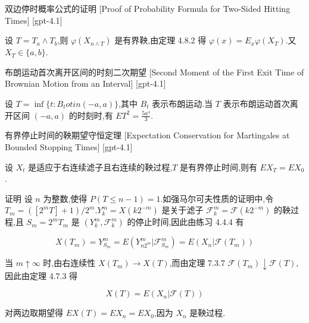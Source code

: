 \documentclass[UTF8]{ctexart}
\begin{document}
    
    
    \begin{prf}
        {双边停时概率公式的证明}
        [Proof of Probability Formula for Two-Sided Hitting Times]
        [gpt-4.1]
        
设 $T = T_a \land T_b$,则 $\varphi(X_{n \wedge T})$ 是有界鞅,由定理 4.8.2 得 $\varphi(x) = E_x \varphi(X_T)$.又 $X_T \in \{a, b\}$.

    \end{prf}
    
    
    
    \begin{thm}
        {布朗运动首次离开区间的时刻二次期望}
        [Second Moment of the First Exit Time of Brownian Motion from an Interval]
        [gpt-4.1]
        
设 $T = \operatorname*{inf} \{ t : B_{t} 
otin (-a, a) \}$,其中 $B_t$ 表示布朗运动.当 $T$ 表示布朗运动首次离开区间 $(-a, a)$ 的时刻时,有 $E T^{2} = \frac{5 a^{4}}{3}$.

    \end{thm}
    
    
    
    \begin{thm}
        {有界停止时间的鞅期望守恒定理}
        [Expectation Conservation for Martingales at Bounded Stopping Times]
        [gpt-4.1]
        
设 $X_{t}$ 是适应于右连续滤子且右连续的鞅过程,$T$ 是有界停止时间,则有 $E X_{T} = E X_{0}$.

证明 设 $n$ 为整数,使得 $P(T \leq n-1) = 1$.如强马尔可夫性质的证明中,令 $T_{m} = ([2^{m} T] + 1)/2^{m}$.$Y_{k}^{m} = X(k 2^{-m})$ 是关于滤子 $\mathcal{F}_{k}^{m} = \mathcal{F}(k 2^{-m})$ 的鞅过程,且 $S_{m} = 2^{m} T_{m}$ 是 $(Y_{k}^{m}, \mathcal{F}_{k}^{m})$ 的停止时间,因此由练习 4.4.4 有

\[
X(T_{m}) = Y_{S_{m}}^{m} = E(Y_{n 2^{m}}^{m} | \mathcal{F}_{S_{m}}^{m}) = E(X_{n} | \mathcal{F}(T_{m}))
\]

当 $m \uparrow \infty$ 时,由右连续性 $X(T_{m}) \to X(T)$,而由定理 7.3.7 $\mathcal{F}(T_{m}) \downarrow \mathcal{F}(T)$,因此由定理 4.7.3 得

\[
X(T) = E(X_{n} | \mathcal{F}(T))
\]

对两边取期望得 $E X(T) = E X_{n} = E X_{0}$,因为 $X_{n}$ 是鞅过程.

    \end{thm}
    
\end{document}
